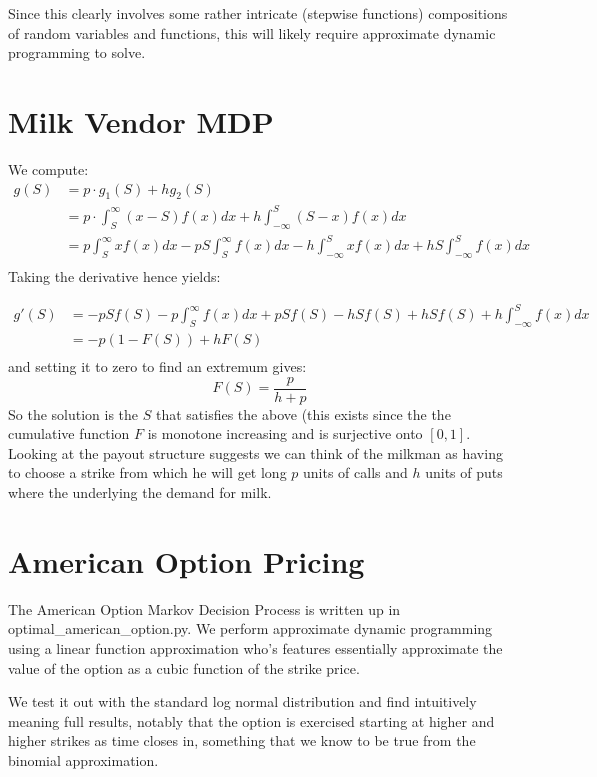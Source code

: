 \documentclass{article}[12pt]
\begin{document}
Since this clearly involves some rather intricate (stepwise functions) compositions of random variables and functions, this will likely require approximate dynamic programming to solve.

\section{Milk Vendor MDP}
We compute:
\begin{align*}
g(S) &= p\cdot g_1(S) + h g_2(S)\\
&= p\cdot \int_{S}^{\infty} (x-S)f(x)dx+ h \int_{-\infty}^S (S-x)f(x)dx\\
&= p \int_{S}^{\infty}xf(x)dx-pS\int_{S}^{\infty}f(x)dx- h \int_{-\infty}^Sxf(x)dx + hS\int_{-\infty}^Sf(x)dx\\
\end{align*}
Taking the derivative hence yields:

\begin{align*}
g'(S) &= -pSf(S)-p\int_{S}^{\infty}f(x)dx + pSf(S) - h Sf(S) + hSf(S)+h\int_{-\infty}^Sf(x)dx\\
&= -p(1-F(S)) +hF(S)\\
\end{align*}
and setting it to zero to find an extremum gives:
$$ F(S) = \frac{p}{h+p}$$
So the solution is the $S$ that satisfies the above (this exists since the the cumulative function $F$ is monotone increasing and is surjective onto $[0,1]$.\\

Looking at the payout structure suggests we can think of the milkman as having to choose a strike from which he will get long $p$ units of calls and $h$ units of puts where the underlying the demand for milk.

\section{American Option Pricing}
The American Option Markov Decision Process is written up in optimal\_american\_option.py. We perform approximate dynamic programming using a linear function approximation who's features essentially approximate the value of the option as a cubic function of the strike price.

We test it out with the standard log normal distribution and find intuitively meaning full results, notably that the option is exercised starting at higher and higher strikes as time closes in, something that we know to be true from the binomial approximation. 
\end{document}
